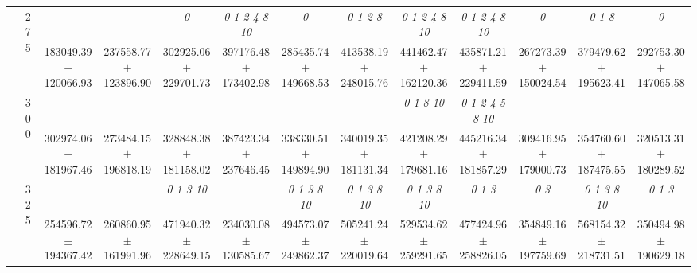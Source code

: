 \begin{table}[h]
{\begin{tabular}{
        ccccccccccccc}
 & \multirow{2}{*}{275}& \cellcolor[HTML]{EFEFEF} & \cellcolor[HTML]{EFEFEF} & \cellcolor[HTML]{EFEFEF} \textit{ 0 }& \cellcolor[HTML]{EFEFEF} \textit{  0  1  2  4  8 10 }& \cellcolor[HTML]{EFEFEF} \textit{ 0 }& \cellcolor[HTML]{EFEFEF} \textit{ 0 1 2 8 }& \cellcolor[HTML]{EFEFEF} \textit{  0  1  2  4  8 10 }& \cellcolor[HTML]{EFEFEF} \textit{  0  1  2  4  8 10 }& \cellcolor[HTML]{EFEFEF} \textit{ 0 }& \cellcolor[HTML]{EFEFEF} \textit{ 0 1 8 }& \cellcolor[HTML]{EFEFEF} \textit{ 0 } \\ 
 & & \cellcolor[HTML]{EFEFEF} 183049.39 $\pm$ 120066.93& \cellcolor[HTML]{EFEFEF} 237558.77 $\pm$ 123896.90& \cellcolor[HTML]{EFEFEF} 302925.06 $\pm$ 229701.73& \cellcolor[HTML]{EFEFEF} 397176.48 $\pm$ 173402.98& \cellcolor[HTML]{EFEFEF} 285435.74 $\pm$ 149668.53& \cellcolor[HTML]{EFEFEF} 413538.19 $\pm$ 248015.76& \cellcolor[HTML]{EFEFEF} 441462.47 $\pm$ 162120.36& \cellcolor[HTML]{EFEFEF} 435871.21 $\pm$ 229411.59& \cellcolor[HTML]{EFEFEF} 267273.39 $\pm$ 150024.54& \cellcolor[HTML]{EFEFEF} 379479.62 $\pm$ 195623.41& \cellcolor[HTML]{EFEFEF} 292753.30 $\pm$ 147065.58 \\ 
 & \multirow{2}{*}{300}& & & & & & & \textit{  0  1  8 10 }& \textit{  0  1  2  4  5  8 10 }& & &  \\ 
 & & 302974.06 $\pm$ 181967.46& 273484.15 $\pm$ 196818.19& 328848.38 $\pm$ 181158.02& 387423.34 $\pm$ 237646.45& 338330.51 $\pm$ 149894.90& 340019.35 $\pm$ 181131.34& 421208.29 $\pm$ 179681.16& 445216.34 $\pm$ 181857.29& 309416.95 $\pm$ 179000.73& 354760.60 $\pm$ 187475.55& 320513.31 $\pm$ 180289.52 \\ 
 & \multirow{2}{*}{325}& \cellcolor[HTML]{EFEFEF} & \cellcolor[HTML]{EFEFEF} & \cellcolor[HTML]{EFEFEF} \textit{  0  1  3 10 }& \cellcolor[HTML]{EFEFEF} & \cellcolor[HTML]{EFEFEF} \textit{  0  1  3  8 10 }& \cellcolor[HTML]{EFEFEF} \textit{  0  1  3  8 10 }& \cellcolor[HTML]{EFEFEF} \textit{  0  1  3  8 10 }& \cellcolor[HTML]{EFEFEF} \textit{ 0 1 3 }& \cellcolor[HTML]{EFEFEF} \textit{ 0 3 }& \cellcolor[HTML]{EFEFEF} \textit{  0  1  3  8 10 }& \cellcolor[HTML]{EFEFEF} \textit{ 0 1 3 } \\ 
 & & \cellcolor[HTML]{EFEFEF} 254596.72 $\pm$ 194367.42& \cellcolor[HTML]{EFEFEF} 260860.95 $\pm$ 161991.96& \cellcolor[HTML]{EFEFEF} 471940.32 $\pm$ 228649.15& \cellcolor[HTML]{EFEFEF} 234030.08 $\pm$ 130585.67& \cellcolor[HTML]{EFEFEF} 494573.07 $\pm$ 249862.37& \cellcolor[HTML]{EFEFEF} 505241.24 $\pm$ 220019.64& \cellcolor[HTML]{EFEFEF} 529534.62 $\pm$ 259291.65& \cellcolor[HTML]{EFEFEF} 477424.96 $\pm$ 258826.05& \cellcolor[HTML]{EFEFEF} 354849.16 $\pm$ 197759.69& \cellcolor[HTML]{EFEFEF} 568154.32 $\pm$ 218731.51& \cellcolor[HTML]{EFEFEF} 350494.98 $\pm$ 190629.18 \\ 

\end{tabular}}
\end{table}
